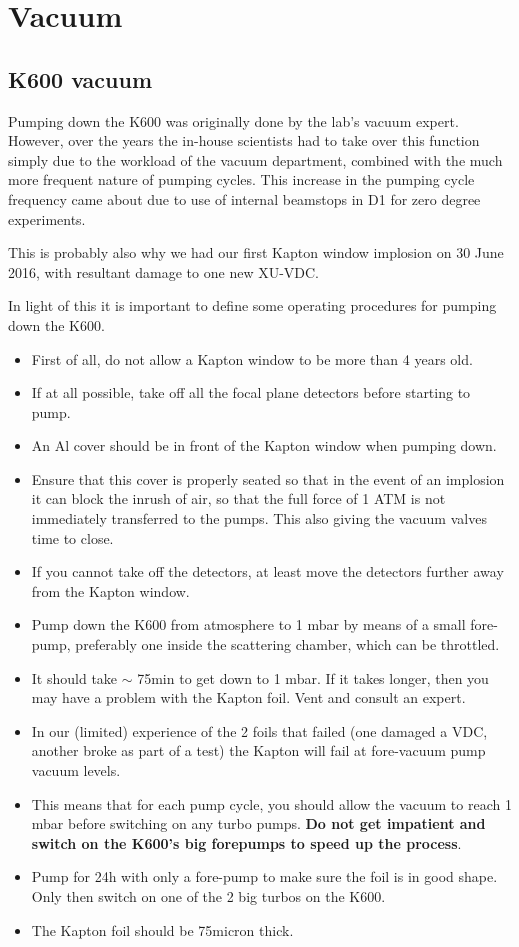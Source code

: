 \documentclass[11pt]{report}
\begin{document}
\chapter{Vacuum}\label{chap:Vacuum}

\section{K600 vacuum}

Pumping down the K600 was originally done by the lab's vacuum expert. However, over the years
the in-house scientists had to take over this function simply due to the workload of the vacuum department,
combined with the much more frequent nature of pumping cycles. This increase in 
the pumping cycle frequency came about due to use of internal beamstops in D1 for zero degree experiments.

This is probably also why we had our first Kapton window implosion on 30 June 2016, with resultant
damage to one new XU-VDC.

In light of this it is important to define some operating procedures for pumping down the K600.
\begin{itemize}
\item First of all, do not allow a Kapton window to be more than 4 years old.
\item If at all possible, take off all the focal plane detectors before starting to pump.
\item An Al cover should be in front of the Kapton window when pumping down. 
\item Ensure that this cover is properly seated so that in the event of an implosion it can 
block the inrush of air, so that the full force of 1 ATM is not immediately transferred to the pumps.
This also giving the vacuum valves time to close.
\item
If you cannot take off the detectors, at least move the detectors further away from the Kapton window.
\item Pump down the K600 from atmosphere to 1 mbar by means of a small fore-pump, preferably one
inside the scattering chamber, which can be throttled.
\item It should take $\sim$ 75min to get down to 1 mbar. If it takes longer, then you may have
a problem with the Kapton foil. Vent and consult an expert.
\item In our (limited) experience of the 2 foils that failed (one damaged a VDC, another broke as 
part of a test) the Kapton will fail at fore-vacuum pump vacuum levels. 
\item This means that for each pump cycle, you should allow the vacuum to reach 1 mbar before switching
on any turbo pumps. {\bf Do not get impatient and switch on the K600's big forepumps to speed up the process}.
\item Pump for 24h with only a fore-pump to make sure the foil is in good shape. Only then switch on one of 
the 2 big turbos on the K600.
\item The Kapton foil should be 75micron thick.


\end{itemize}
\end{document}
